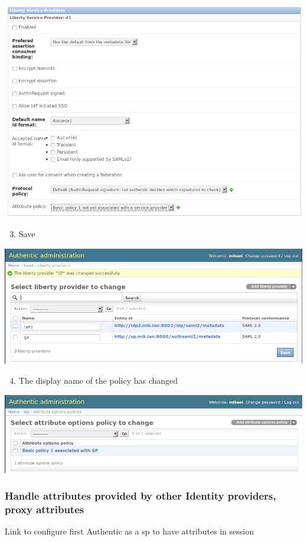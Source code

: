 \documentclass[letterpaper,10pt,english]{sphinxmanual}
\begin{document}
\includegraphics{sp_policy_pull.png}
\begin{enumerate}
\setcounter{enumi}{2}
\item {} 
Save

\end{enumerate}

\includegraphics{sp_policy_pull_saved.png}
\begin{enumerate}
\setcounter{enumi}{3}
\item {} 
The display name of the policy has changed

\end{enumerate}

\includegraphics{policy_pull_renamed.png}


\subsubsection{Handle attributes provided by other Identity providers, proxy attributes}
\label{attribute_management:handle-attributes-provided-by-other-identity-providers-proxy-attributes}
Link to configure first Authentic as a sp to have attributes in session
\end{document}
